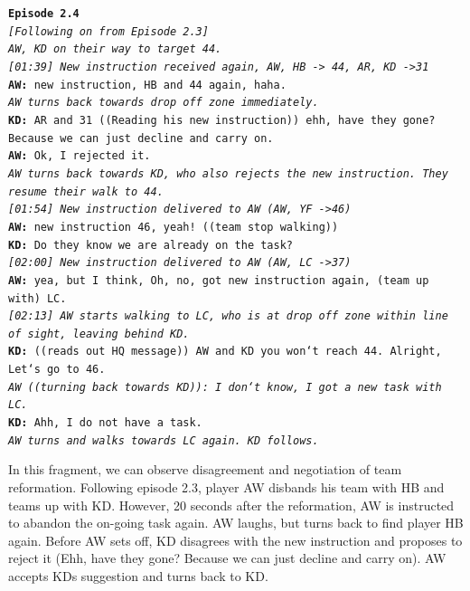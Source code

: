 \noindent\texttt{\textbf{Episode 2.4}\\
\emph{[Following on from Episode 2.3]}\\
\emph{AW, KD on their way to target 44.}\\
\emph{[01:39] New instruction received again, AW, HB -> 44, AR, KD ->31}\\
\textbf{AW:} new instruction, HB and 44 again, haha.\\
\emph{AW turns back towards drop off zone immediately.}\\
\textbf{KD:} AR and 31 ((Reading his new instruction)) ehh, have they gone? Because we can just decline and carry on.\\
\textbf{AW:} Ok, I rejected it. \\
\emph{AW turns back towards KD, who also rejects the new instruction. They resume their walk to 44.}\\
\emph{[01:54] New instruction delivered to AW (AW, YF ->46)}\\
\textbf{AW:} new instruction 46, yeah! ((team stop walking))\\
\textbf{KD:} Do they know we are already on the task?\\
\emph{[02:00] New instruction delivered to AW (AW, LC ->37)}\\
\textbf{AW:} yea, but I think, Oh, no, got new instruction again, (team up with) LC.\\
\emph{[02:13] AW starts walking to LC, who is at drop off zone within line of sight, leaving behind KD.}\\
\textbf{KD:} ((reads out HQ message)) AW and KD you won`t reach 44.  Alright, Let`s go to 46.\\
\emph{AW ((turning back towards KD)): I don`t know, I got a new task with LC.}\\
\textbf{KD:} Ahh, I do not have a task. \\
\emph{AW turns and walks towards LC again. KD follows.}\\
}


In this fragment, we can observe disagreement and negotiation of team reformation. Following episode 2.3, player AW disbands his team with HB and teams up with KD. However, 20 seconds after the reformation, AW is instructed to abandon the on-going task again. AW laughs, but turns back to find player HB again. Before AW sets off, KD disagrees with the new instruction and proposes to reject it (Ehh, have they gone? Because we can just decline and carry on). AW accepts KDs suggestion and turns back to KD.\\

